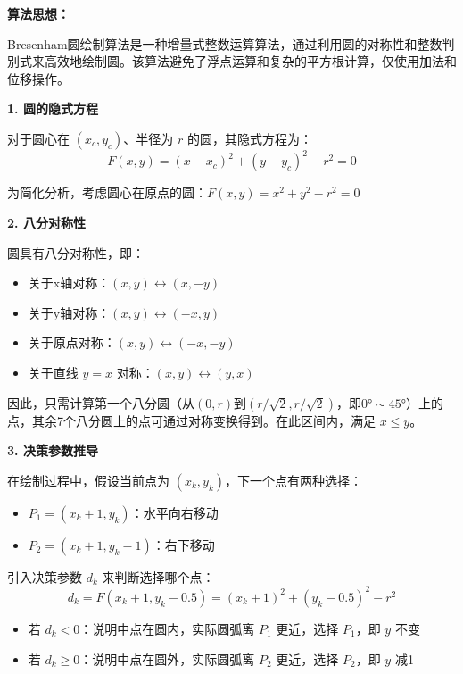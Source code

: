 ﻿\documentclass[12pt,a4paper]{article}
\begin{document}
\begin{tcolorbox}[breakable]
\textbf{算法思想：}

Bresenham圆绘制算法是一种增量式整数运算算法，通过利用圆的对称性和整数判别式来高效地绘制圆。该算法避免了浮点运算和复杂的平方根计算，仅使用加法和位移操作。

\textbf{1. 圆的隐式方程}

对于圆心在 $(x_c, y_c)$、半径为 $r$ 的圆，其隐式方程为：
\begin{equation}
F(x,y) = (x-x_c)^2 + (y-y_c)^2 - r^2 = 0
\end{equation}

为简化分析，考虑圆心在原点的圆：$F(x,y) = x^2 + y^2 - r^2 = 0$

\textbf{2. 八分对称性}

圆具有八分对称性，即：
\begin{itemize}
\item 关于x轴对称：$(x,y) \leftrightarrow (x,-y)$
\item 关于y轴对称：$(x,y) \leftrightarrow (-x,y)$
\item 关于原点对称：$(x,y) \leftrightarrow (-x,-y)$
\item 关于直线 $y=x$ 对称：$(x,y) \leftrightarrow (y,x)$
\end{itemize}

因此，只需计算第一个八分圆（从$(0,r)$到$(r/\sqrt{2}, r/\sqrt{2})$，即$0° \sim 45°$）上的点，其余7个八分圆上的点可通过对称变换得到。在此区间内，满足 $x \leq y$。

\textbf{3. 决策参数推导}

在绘制过程中，假设当前点为 $(x_k, y_k)$，下一个点有两种选择：
\begin{itemize}
\item $P_1 = (x_k+1, y_k)$：水平向右移动
\item $P_2 = (x_k+1, y_k-1)$：右下移动
\end{itemize}

引入决策参数 $d_k$ 来判断选择哪个点：
\begin{equation}
d_k = F(x_k+1, y_k-0.5) = (x_k+1)^2 + (y_k-0.5)^2 - r^2
\end{equation}

\begin{itemize}
\item 若 $d_k < 0$：说明中点在圆内，实际圆弧离 $P_1$ 更近，选择 $P_1$，即 $y$ 不变
\item 若 $d_k \geq 0$：说明中点在圆外，实际圆弧离 $P_2$ 更近，选择 $P_2$，即 $y$ 减1
\end{itemize}


\end{tcolorbox}
\end{document}
